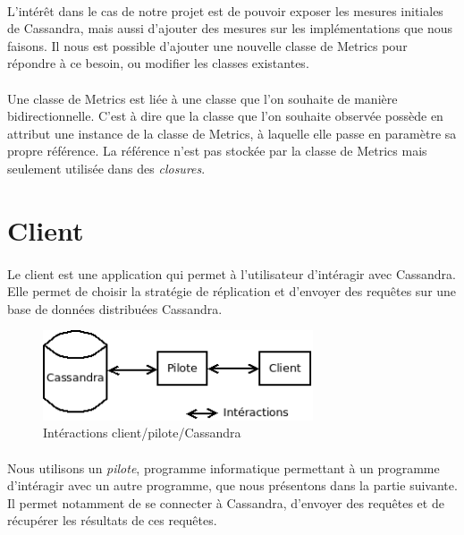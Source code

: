 \documentclass[12pt]{article}
\begin{document}
\paragraph{} L'intérêt dans le cas de notre projet est de pouvoir exposer les mesures initiales de Cassandra, mais aussi d'ajouter des mesures sur les implémentations que nous faisons. Il nous est possible d'ajouter une nouvelle classe de Metrics pour répondre à ce besoin, ou modifier les classes existantes.

\paragraph{} Une classe de Metrics est liée à une classe que l'on souhaite de manière bidirectionnelle. C'est à dire que la classe que l'on souhaite observée possède en attribut une instance de la classe de Metrics, à laquelle elle passe en paramètre sa propre référence. La référence n'est pas stockée par la classe de Metrics mais seulement utilisée dans des \textit{closures}.


\newpage

\section{Client}

\paragraph{} Le client est une application qui permet à l'utilisateur d'intéragir avec Cassandra. 
Elle permet de choisir la stratégie de réplication et d'envoyer des requêtes sur une base de données distribuées Cassandra.

\begin{figure}[H]
	\centering
		\includegraphics[width=8cm]{schemas/pilote.png}
	\caption{Intéractions client/pilote/Cassandra \label{fig:pilote}}
\end{figure}

\paragraph{} Nous utilisons un \textit{pilote}, programme informatique permettant à un programme d'intéragir avec un autre programme, que nous présentons dans la partie suivante.
Il permet notamment de se connecter à Cassandra, d'envoyer des requêtes et de récupérer les résultats de ces requêtes.
\end{document}
